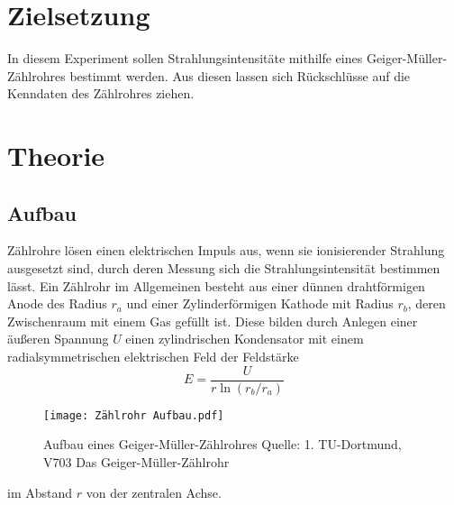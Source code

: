 \section{Zielsetzung}
In diesem Experiment sollen Strahlungsintensitäte mithilfe eines Geiger-Müller-Zählrohres bestimmt werden. Aus diesen lassen sich Rückschlüsse auf die Kenndaten des Zählrohres ziehen.
\section{Theorie}
\subsection{Aufbau}
Zählrohre lösen einen elektrischen Impuls aus, wenn sie ionisierender Strahlung ausgesetzt sind, durch deren Messung sich die Strahlungsintensität bestimmen lässt.
Ein Zählrohr im Allgemeinen besteht aus einer dünnen drahtförmigen Anode des Radius $r_a$ und einer Zylinderförmigen Kathode mit Radius $r_b$, deren Zwischenraum mit einem Gas gefüllt ist. Diese bilden durch Anlegen einer äußeren Spannung $U$ einen zylindrischen Kondensator mit einem radialsymmetrischen elektrischen Feld der Feldstärke
\begin{equation*}
E=\frac{U}{r\ln(r_b/r_a)}
\end{equation*}
\begin{figure}[h]
  \centering
  \texttt{[image: Zählrohr Aufbau.pdf]} 
  \caption{Aufbau eines Geiger-Müller-Zählrohres Quelle: 1. TU-Dortmund, V703 Das Geiger-Müller-Zählrohr} %
  \label{fig:vanadium}
\end{figure}
im Abstand $r$ von der zentralen Achse.
